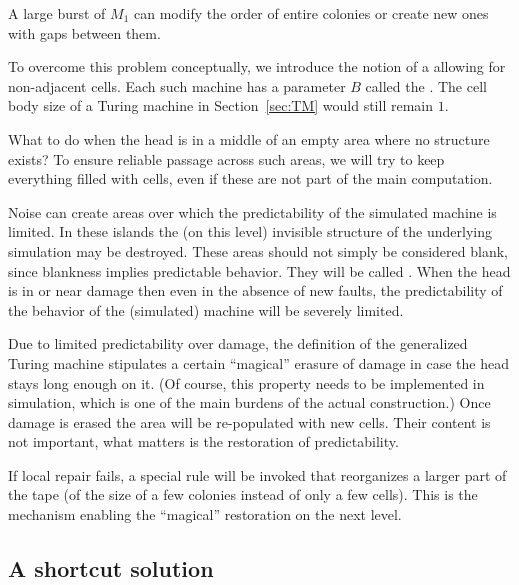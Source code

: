 \documentclass[12pt]{memoir}
\renewcommand{\B}{B}
\begin{document}
\begin{bullets}

\item A large burst of $M_1$ can modify the order of
entire colonies or create new ones with gaps between them.

To overcome this problem conceptually, we 
introduce the notion of a 
allowing for non-adjacent cells.
Each such machine has a parameter $\B$ called the .
The cell body size of a Turing machine in Section~\ref{sec:TM} would still remain
$1$.

    \item What to do when the head is in a middle of an empty area
       where no structure exists?
To ensure reliable passage across such areas,
we will try to keep everything filled with cells, even if these are
not part of the main computation.

    \item Noise can create areas over
     which the predictability of the simulated machine is limited.
     In these islands the (on this level) invisible structure
     of the underlying simulation may be destroyed.
     These areas should not simply be considered blank, since
     blankness implies predictable behavior.
     They will be called .
     When the head is in or near damage then even in the absence of new faults,
     the predictability of the behavior of the (simulated) machine will be
     severely limited.

\item Due to limited predictability over damage, the definition of the generalized
Turing machine stipulates a certain ``magical'' erasure of damage in case the
head stays long enough on it.
(Of course, this property needs to be implemented in simulation, which is one of the
main burdens of the actual construction.)
Once damage is erased the area will be re-populated with new cells.
Their content is not important, what matters is the restoration of predictability.

        \item If local repair fails, a special rule will be invoked that reorganizes a
larger part of the tape (of the size of a few colonies instead of only a few cells).
This is the mechanism enabling the ``magical'' restoration on the next level.

\end{bullets}

\subsection{A shortcut solution}
\end{document}
